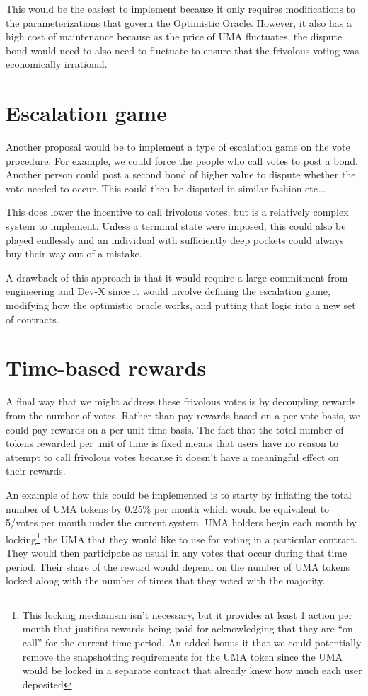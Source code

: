 \item \documentclass[12pt]{article}
\begin{document}
  This would be the easiest to implement because it only requires modifications to the parameterizations that govern
  the Optimistic Oracle. However, it also has a high cost of maintenance because as the price of UMA fluctuates, the
  dispute bond would need to also need to fluctuate to ensure that the frivolous voting was economically irrational.


\section{Escalation game}

  Another proposal would be to implement a type of escalation game on the vote procedure. For example, we could force
  the people who call votes to post a bond. Another person could post a second bond of higher value to dispute whether
  the vote needed to occur. This could then be disputed in similar fashion etc...

  This does lower the incentive to call frivolous votes, but is a relatively complex system to implement. Unless a
  terminal state were imposed, this could also be played endlessly and an individual with sufficiently deep pockets
  could always buy their way out of a mistake.

  A drawback of this approach is that it would require a large commitment from engineering and Dev-X since it would
  involve defining the escalation game, modifying how the optimistic oracle works, and putting that logic into a new
  set of contracts.


\section{Time-based rewards}

  A final way that we might address these frivolous votes is by decoupling rewards from the number of votes. Rather
  than pay rewards based on a per-vote basis, we could pay rewards on a per-unit-time basis. The fact that the total
  number of tokens rewarded per unit of time is fixed means that users have no reason to attempt to call frivolous
  votes because it doesn't have a meaningful effect on their rewards.

  An example of how this could be implemented is to starty by inflating the total number of UMA tokens by 0.25\% per
  month which would be equivalent to 5/votes per month under the current system. UMA holders begin each month by
  locking\footnote{This locking mechanism isn't necessary, but it provides at least 1 action per month that justifies
  rewards being paid for acknowledging that they are ``on-call'' for the current time period. An added bonus it that we
  could potentially remove the snapshotting requirements for the UMA token since the UMA would be locked in a separate
  contract that already knew how much each user deposited} the UMA that they would like to use for voting in a
  particular contract. They would then participate as usual in any votes that occur during that time period. Their share
  of the reward would depend on the number of UMA tokens locked along with the number of times that they voted with the
  majority.
\end{document}
